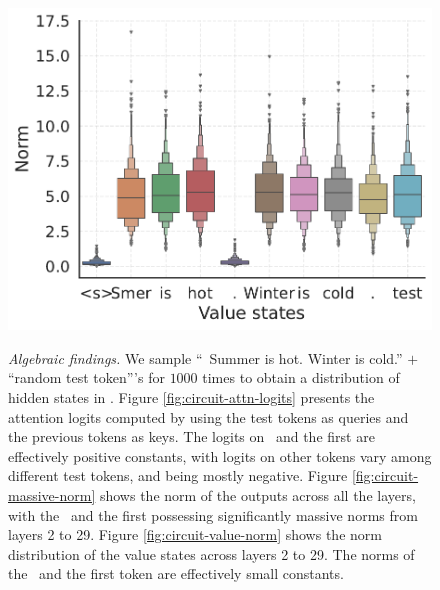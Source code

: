 \begin{figure}[t]
\begin{minipage}{0.33\textwidth}
  \end{minipage}
  \hspace{-1em}
  \begin{minipage}{0.33\textwidth}
      \centering
      \label{fig:circuit-value-norm}
      \vspace{-.2em}
      \includegraphics[width=\linewidth]{Figures/figures_circuit/values.pdf}
  \end{minipage}
  \vspace{-1em}
  \caption{\small \textit{Algebraic findings.} We sample ``\bos~Summer is hot. Winter is cold.'' $+$ ``random test token'''s for $1000$ times to obtain a distribution of hidden states in \llama. Figure \ref{fig:circuit-attn-logits} presents the attention logits computed by using the test tokens as queries and the previous tokens as keys. The logits on \bos~and the first \delim are effectively positive constants, with logits on other tokens vary among different test tokens, and being mostly negative. Figure \ref{fig:circuit-massive-norm} shows the norm of the outputs across all the layers, with the \bos~and the first \delim possessing significantly massive norms from layers 2 to 29. Figure \ref{fig:circuit-value-norm} shows the norm distribution of the value states across layers 2 to 29. The norms of the \bos~and the first \delim token are effectively small constants. 
  }
  \label{figure:algebra-findings}
  \vspace{-1em}
\end{figure}



